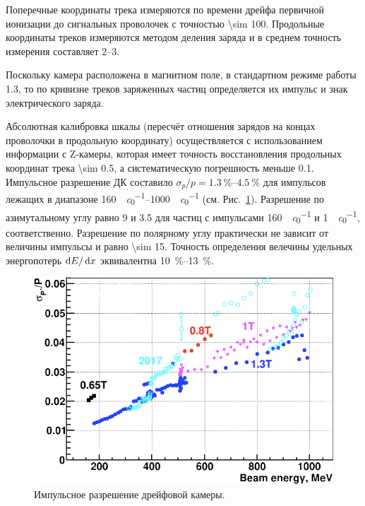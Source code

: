 Поперечные координаты трека измеряются по времени дрейфа первичной ионизации до сигнальных проволочек с точностью \SI{\sim 100}{\umr}.
Продольные координаты треков измеряются методом деления заряда и в среднем точность измерения составляет \SIrange{2}{3}{\mmr}. 

Поскольку камера расположена в магнитном поле,
в стандартном режиме работы \SI{1.3}{\teslaru},
то по кривизне треков заряженных частиц определяется их импульс и знак электрического заряда.

Абсолютная калибровка шкалы (пересчёт отношения зарядов на концах проволочки в продольную координату) осуществляется с использованием информации с Z-камеры,
которая имеет точность восстановления продольных координат трека \SI{\sim 0.5}{\mmr},
а систематическую погрешность меньше \SI{0.1}{\mmr}.
Импульсное разрешение ДК составило
$\sigma_p / p = \SIrange{1.3}{4.5}{\percent}$
для импульсов лежащих в диапазоне
\SIrange{160}{1000}{\MeVr \per \clight} (см. Рис.~\ref{fig:dc_mom_res}).
Разрешение по азимутальному углу равно \SI{9}{\mradianru} и \SI{3.5}{\mradianru}
для частиц с импульсами \SI{160}{\MeVr \per \clight} и \SI{1}{\GeVr \per \clight},
соответственно.
Разрешение по полярному углу практически не зависит от величины импульсы
и равно \SI{\sim 15}{\mradianru}.
Точность определения велечины удельных энергопотерь $\dif E / \dif x$
эквивалентна \SIrange{10}{13}{\percent}.


\begin{figure}
    \centering
    \includegraphics[height=.5\textwidth]{img/cmd3_detector/dc_mom_res.png}
    \caption{Импульсное разрешение дрейфовой камеры.}
    \label{fig:dc_mom_res}
\end{figure}



